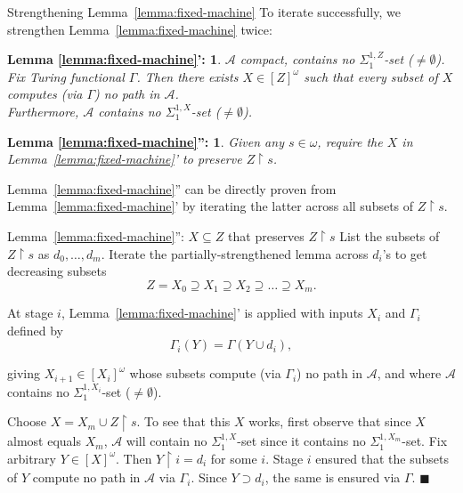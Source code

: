 \begin{frame}{Strengthening Lemma~\ref{lemma:fixed-machine}}
  To iterate successfully, we strengthen Lemma~\ref{lemma:fixed-machine}
  twice:
  \newtheorem*{lemma-strengthened1*}{Lemma \ref{lemma:fixed-machine}':}
  \begin{lemma-strengthened1*}
    $\mathcal{A}$ compact, contains no $\Sigma_1^{1,Z}$-set
    ($\neq\emptyset$). Fix Turing functional $\Gamma$. Then
    there exists $X\in[Z]^\omega$ such that every subset of $X$ computes
    (via $\Gamma$) no path in $\mathcal{A}$.\\
    \vspace{0.5em}
    Furthermore, $\mathcal{A}$ contains no $\Sigma_1^{1,X}$-set
    ($\neq\emptyset$).
  \end{lemma-strengthened1*}

  \vspace{0.5em}
  \newtheorem*{lemma-strengthened2*}{Lemma \ref{lemma:fixed-machine}'':}
  \begin{lemma-strengthened2*}
    Given any $s\in\omega$, require the $X$ in
    Lemma~\ref{lemma:fixed-machine}' to preserve $Z\restriction s$.
  \end{lemma-strengthened2*}

  \vspace{0.5em}
  Lemma~\ref{lemma:fixed-machine}'' can be directly proven from
  Lemma~\ref{lemma:fixed-machine}' by iterating the latter across all
  subsets of $Z\restriction s$.
\end{frame}

\begin{frame}{Lemma~\ref{lemma:fixed-machine}'': $X\subseteq Z$ that
preserves $Z\restriction s$}
  List the subsets of $Z\restriction s$ as $d_0,\ldots,d_m$. Iterate the
  partially-strengthened lemma across $d_i$'s to get decreasing subsets
  \[Z=X_0 \supseteq X_1 \supseteq X_2 \supseteq\ldots \supseteq X_m.\]

  At stage $i$, Lemma~\ref{lemma:fixed-machine}' is applied with inputs
  $X_i$ and $\Gamma_i$ defined by
  \[\Gamma_i(Y) =\Gamma(Y\cup d_i),\]

  giving $X_{i+1}\in[X_i]^\omega$ whose subsets compute (via
  $\Gamma_i$) no path in $\mathcal{A}$, and where $\mathcal{A}$ contains no
  $\Sigma_1^{1,X_i}$-set ($\neq\emptyset$).

  \vspace{0.5em}
  Choose $X=X_m\cup Z\restriction s$. To see that this $X$ works, first
  observe that since $X$ almost equals $X_m$, $\mathcal{A}$ will
  contain no $\Sigma_1^{1,X}$-set since it contains no
  $\Sigma_1^{1,X_m}$-set. Fix arbitrary $Y\in[X]^\omega$. Then
  $Y\restriction i=d_i$ for some $i$. Stage $i$ ensured that the subsets of
  $Y$ compute no path in $\mathcal{A}$ via $\Gamma_i$. Since $Y\supset
  d_i$, the same is ensured via $\Gamma$. $\blacksquare$
\end{frame}

